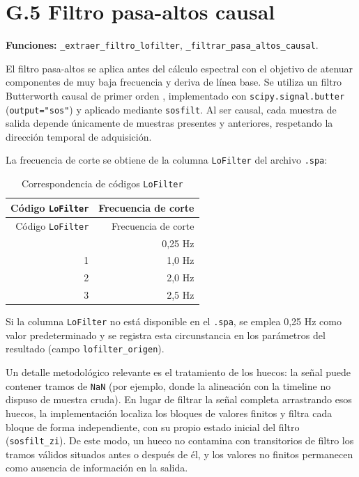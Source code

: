 \documentclass[
  spanish,
  a4paper,
  12pt,
  twoside]{memoir}
\begin{document}
\chapter{G.5 Filtro pasa-altos
causal}\label{g.5-filtro-pasa-altos-causal}

\textbf{Funciones:} \texttt{\_extraer\_filtro\_lofilter},
\texttt{\_filtrar\_pasa\_altos\_causal}.

El filtro pasa-altos se aplica antes del cálculo espectral con el
objetivo de atenuar componentes de muy baja frecuencia y deriva de línea
base. Se utiliza un filtro Butterworth causal de primer orden
\citep{OppenheimSchafer2014}, implementado con
\texttt{scipy.signal.butter} (\texttt{output="sos"}) y aplicado mediante
\texttt{sosfilt}. Al ser causal, cada muestra de salida depende
únicamente de muestras presentes y anteriores, respetando la dirección
temporal de adquisición.

La frecuencia de corte se obtiene de la columna \texttt{LoFilter} del
archivo \texttt{.spa}:

\begin{longtable}[]{@{}rr@{}}
\caption{Correspondencia de códigos
\protect\texttt{LoFilter}}\label{tbl-lofilter-anexo}\tabularnewline
\toprule\noalign{}
Código \texttt{LoFilter} & Frecuencia de corte \\
\midrule\noalign{}
\endfirsthead
\toprule\noalign{}
Código \texttt{LoFilter} & Frecuencia de corte \\
\midrule\noalign{}
\endhead
\bottomrule\noalign{}
\endlastfoot
0 & 0,25 Hz \\
1 & 1,0 Hz \\
2 & 2,0 Hz \\
3 & 2,5 Hz \\
\end{longtable}

Si la columna \texttt{LoFilter} no está disponible en el \texttt{.spa},
se emplea 0,25 Hz como valor predeterminado y se registra esta
circunstancia en los parámetros del resultado (campo
\texttt{lofilter\_origen}).

Un detalle metodológico relevante es el tratamiento de los huecos: la
señal puede contener tramos de \texttt{NaN} (por ejemplo, donde la
alineación con la timeline no dispuso de muestra cruda). En lugar de
filtrar la señal completa arrastrando esos huecos, la implementación
localiza los bloques de valores finitos y filtra cada bloque de forma
independiente, con su propio estado inicial del filtro
(\texttt{sosfilt\_zi}). De este modo, un hueco no contamina con
transitorios de filtro los tramos válidos situados antes o después de
él, y los valores no finitos permanecen como ausencia de información en
la salida.
\end{document}
